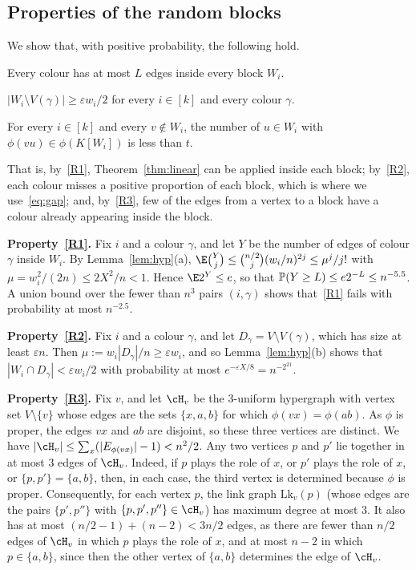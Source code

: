 \subsection{Properties of the random blocks}\label{sec:blockprops}
We show that, with positive probability, the following hold.
\begin{props}
\item Every colour has at most $L$ edges inside every block $W_i$.\label{R1}
\item $|W_i\setminus V(\gamma)|\ge\varepsilon w_i/2$ for every $i\in [k]$ and every colour $\gamma$.\label{R2}
\item For every $i\in [k]$ and every $v\notin W_i$, the number of $u\in W_i$ with $\phi(vu)\in\phi(K[W_i])$ is less than $t$.\label{R3}
\end{props}
That is, by~\ref{R1}, Theorem~\ref{thm:linear} can be applied inside each block; by~\ref{R2}, each colour misses a positive proportion of each block, which is where we use~\eqref{eq:gap}; and, by~\ref{R3}, few of the edges from a vertex to a block have a colour already appearing inside the block.

\smallskip

\noindent\textbf{Property~\ref{R1}.}
Fix $i$ and a colour $\gamma$, and let $Y$ be the number of edges of colour $\gamma$ inside $W_i$. By Lemma~\ref{lem:hyp}(a), $\E\binom Yj\le\binom{n/2}{j}(w_i/n)^{2j}\le\mu^j/j!$ with $\mu=w_i^2/(2n)\le 2X^2/n<1$. Hence $\E2^Y\le e$, so that $\mathbb{P}(Y\ge L)\le e2^{-L}\le n^{-5.5}$. A union bound over the fewer than $n^3$ pairs $(i,\gamma)$ shows that~\ref{R1} fails with probability at most $n^{-2.5}$.

\smallskip

\noindent\textbf{Property~\ref{R2}.}
Fix $i$ and a colour $\gamma$, and let $D_\gamma=V\setminus V(\gamma)$, which has size at least $\varepsilon n$. Then $\mu:=w_i|D_\gamma|/n\ge\varepsilon w_i$, and so Lemma~\ref{lem:hyp}(b) shows that $|W_i\cap D_\gamma|<\varepsilon w_i/2$ with probability at most $e^{-\varepsilon X/8}=n^{-2^{21}}$.

\smallskip

\noindent\textbf{Property~\ref{R3}.}
Fix $v$, and let $\cH_v$ be the $3$-uniform hypergraph with vertex set $V\setminus\{v\}$ whose edges are the sets $\{x,a,b\}$ for which $\phi(vx)=\phi(ab)$. As $\phi$ is proper, the edges $vx$ and $ab$ are disjoint, so these three vertices are distinct. We have $|\cH_v|\le\sum_x(|E_{\phi(vx)}|-1)<n^2/2$.
Any two vertices $p$ and $p'$ lie together in at most $3$ edges of $\cH_v$. Indeed, if $p$ plays the role of $x$, or $p'$ plays the role of $x$, or $\{p,p'\}=\{a,b\}$, then, in each case, the third vertex is determined because $\phi$ is proper.
Consequently, for each vertex $p$, the link graph $\mathrm{Lk}_v(p)$ (whose edges are the pairs $\{p',p''\}$ with $\{p,p',p''\}\in \cH_v$) has maximum degree at most $3$. It also has at most $(n/2-1)+(n-2)<3n/2$ edges, as there are fewer than $n/2$ edges of $\cH_v$ in which $p$ plays the role of $x$, and at most $n-2$ in which $p\in\{a,b\}$, since then the other vertex of $\{a,b\}$ determines the edge of $\cH_v$.

